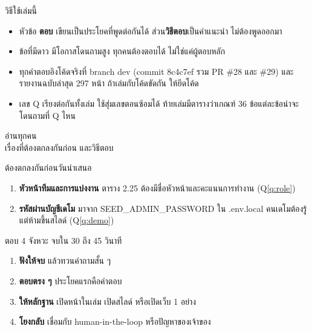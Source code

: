 \documentclass[12pt,a4paper]{article}
\newcommand{\code}[1]{{\mono #1}}
\begin{document}
\vspace{6pt}
{\heavy\Large วิธีใช้เล่มนี้}\par
\begin{itemize}
  \item หัวข้อ \textbf{ตอบ} เขียนเป็นประโยคที่พูดต่อกันได้ ส่วน\textbf{วิธีตอบ}เป็นคำแนะนำ ไม่ต้องพูดออกมา
  \item ข้อที่มีดาว  มีโอกาสโดนถามสูง ทุกคนต้องตอบได้ ไม่ใช่แค่ผู้ตอบหลัก
  \item ทุกคำตอบอิงโค้ดจริงที่ branch \code{dev} (commit \code{8c4c7ef} รวม PR \#28 และ \#29) และรายงานฉบับล่าสุด 297 หน้า ถ้าเล่มกับโค้ดขัดกัน ให้ยึดโค้ด
  \item เลข Q เรียงต่อกันทั้งเล่ม ใช้สุ่มเลขตอนซ้อมได้ ท้ายเล่มมีตารางว่าเกณฑ์ 36 ข้อแต่ละข้อน่าจะโดนถามที่ Q ไหน
\end{itemize}

\clearpage
\begin{tcolorbox}[enhanced,colback=ink,colframe=ink,arc=4pt,left=10pt,right=10pt,top=8pt,bottom=8pt]
  \color{white}{\heavy\huge ก่อนเริ่ม}\hfill{\Large อ่านทุกคน}\\[2pt]
  {\large เรื่องที่ต้องตกลงกันก่อน และวิธีตอบ}
\end{tcolorbox}

{\heavy\Large ต้องตกลงกันก่อนวันนำเสนอ}\par
\begin{enumerate}
  \item \textbf{หัวหน้าทีมและการแบ่งงาน} ตาราง 2.25 ต้องมีชื่อหัวหน้าและคะแนนการทำงาน (Q\ref{q:role})
  \item \textbf{รหัสผ่านบัญชีเดโม} มาจาก \code{SEED\_ADMIN\_PASSWORD} ใน \code{.env.local} คนเดโมต้องรู้ แต่ห้ามขึ้นสไลด์ (Q\ref{q:demo})
\end{enumerate}

{\heavy\Large ตอบ 4 จังหวะ จบใน 30 ถึง 45 วินาที}\par
\begin{enumerate}
  \item \textbf{ฟังให้จบ} แล้วทวนคำถามสั้น ๆ
  \item \textbf{ตอบตรง ๆ} ประโยคแรกคือคำตอบ
  \item \textbf{ให้หลักฐาน} เปิดหน้าในเล่ม เปิดสไลด์ หรือเปิดเว็บ 1 อย่าง
  \item \textbf{โยงกลับ} เชื่อมกับ human-in-the-loop หรือปัญหาของเจ้าของ
\end{enumerate}
\end{document}
